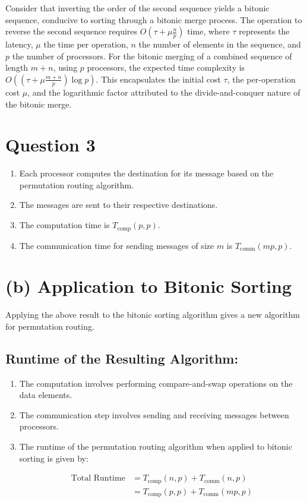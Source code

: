 \documentclass{article}
\begin{document}
Consider that inverting the order of the second sequence yields a bitonic sequence, conducive to sorting through a bitonic merge process. The operation to reverse the second sequence requires $O(\tau + \mu \frac{n}{p})$ time, where $\tau$ represents the latency, $\mu$ the time per operation, $n$ the number of elements in the sequence, and $p$ the number of processors. For the bitonic merging of a combined sequence of length $m+n$, using $p$ processors, the expected time complexity is $O\left((\tau + \mu \frac{m+n}{p}) \log p\right)$. This encapsulates the initial cost $\tau$, the per-operation cost $\mu$, and the logarithmic factor attributed to the divide-and-conquer nature of the bitonic merge.

\section{Question 3}
\begin{enumerate}
\item Each processor computes the destination for its message based on the permutation routing algorithm.
\item The messages are sent to their respective destinations.
\item The computation time is \( T_{\text{comp}}(p, p) \).
\item The communication time for sending messages of size \( m \) is \( T_{\text{comm}}(mp, p) \).
\end{enumerate}

\section*{(b) Application to Bitonic Sorting}

Applying the above result to the bitonic sorting algorithm gives a new algorithm for permutation routing.

\subsection*{Runtime of the Resulting Algorithm:}

\begin{enumerate}
\item The computation involves performing compare-and-swap operations on the data elements.
\item The communication step involves sending and receiving messages between processors.
\item The runtime of the permutation routing algorithm when applied to bitonic sorting is given by:

\begin{align*}
\text{Total Runtime} &= T_{\text{comp}}(n, p) + T_{\text{comm}}(n, p) \\
&= T_{\text{comp}}(p, p) + T_{\text{comm}}(mp, p) \\
\end{align*}

\end{enumerate}
\end{document}
